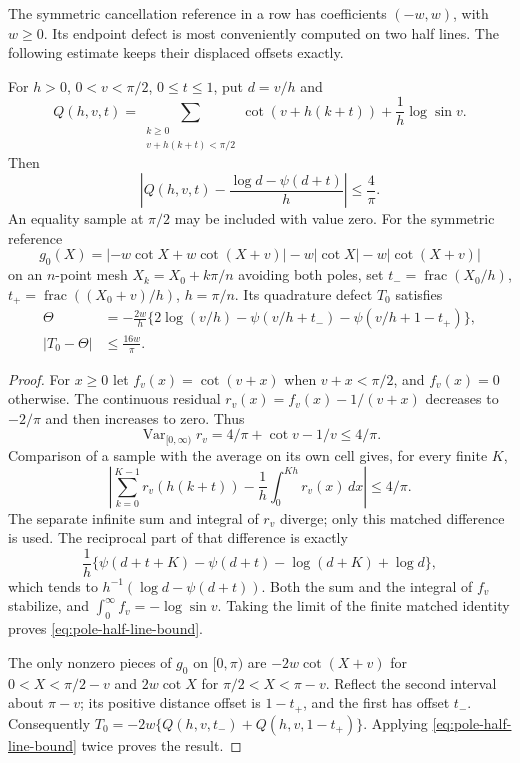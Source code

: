 The symmetric cancellation reference in a row has coefficients
$(-w,w)$, with $w\geq0$.  Its endpoint defect is most conveniently
computed on two half lines.  The following estimate keeps their
displaced offsets exactly.

\begin{lemma}\label{lem:half-line-defect}
For $h>0$, $0<v<\pi/2$, $0\leq t\leq1$, put $d=v/h$ and
\[
 Q(h,v,t)=\sum_{\substack{k\geq0\\v+h(k+t)<\pi/2}}
           \cot(v+h(k+t))+\frac1h\log\sin v.
\]
Then
\begin{equation}\label{eq:pole-half-line-bound}
 \left|Q(h,v,t)-\frac{\log d-\psi(d+t)}h\right|\leq\frac4\pi.
\end{equation}
An equality sample at $\pi/2$ may be included with value zero.
For the symmetric reference
\[
 g_0(X)=|-w\cot X+w\cot(X+v)|
               -w|\cot X|-w|\cot(X+v)|
\]
on an $n$-point mesh $X_k=X_0+k\pi/n$ avoiding both poles, set
$t_- =\operatorname{frac}(X_0/h)$,
$t_+=\operatorname{frac}((X_0+v)/h)$, $h=\pi/n$.
Its quadrature defect $T_0$ satisfies
\begin{align}
 \Theta&=-\frac{2w}h
       \{2\log(v/h)-\psi(v/h+t_-)-\psi(v/h+1-t_+)\},
       \label{eq:pole-half-line-Theta}\\
 |T_0-\Theta|&\leq\frac{16w}\pi.
       \label{eq:pole-half-line-reference-bound}
\end{align}
\end{lemma}

\begin{proof}
For $x\geq0$ let $f_v(x)=\cot(v+x)$ when $v+x<\pi/2$,
and $f_v(x)=0$ otherwise.  The continuous residual
$r_v(x)=f_v(x)-1/(v+x)$ decreases to $-2/\pi$ and then
increases to zero.  Thus
\[
 \operatorname{Var}_{[0,\infty)}r_v
       =4/\pi+\cot v-1/v\leq4/\pi.
\]
Comparison of a sample with the average on its own cell gives, for
every finite $K$,
\[
 \left|\sum_{k=0}^{K-1}r_v(h(k+t))
           -\frac1h\int_0^{Kh}r_v(x)\,dx\right|\leq4/\pi.
\]
The separate infinite sum and integral of $r_v$ diverge; only this
matched difference is used.  The reciprocal part of that difference is
exactly
\[
 \frac1h\{\psi(d+t+K)-\psi(d+t)-\log(d+K)+\log d\},
\]
which tends to $h^{-1}(\log d-\psi(d+t))$.
Both the sum and the integral of $f_v$ stabilize, and
$\int_0^\infty f_v=-\log\sin v$.
Taking the limit of the finite matched identity proves
\eqref{eq:pole-half-line-bound}.

The only nonzero pieces of $g_0$ on $[0,\pi)$ are
$-2w\cot(X+v)$ for $0<X<\pi/2-v$ and
$2w\cot X$ for $\pi/2<X<\pi-v$.
Reflect the second interval about $\pi-v$; its positive distance
offset is $1-t_+$, and the first has offset $t_-$.
Consequently
$T_0=-2w\{Q(h,v,t_-)+Q(h,v,1-t_+)\}$.
Applying \eqref{eq:pole-half-line-bound} twice proves the result.
\end{proof}

